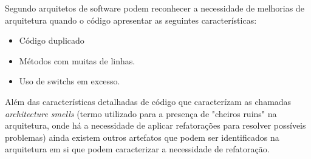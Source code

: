 Segundo \cite{babar2013agile} arquitetos de software podem reconhecer a necessidade de melhorias de arquitetura quando o código apresentar as seguintes características: 
    \begin{itemize}
        \item Código duplicado
        \item Métodos com muitas de linhas.
        \item Uso de switchs em excesso.
    \end{itemize}

Além das características detalhadas de código que caracterízam as chamadas \textit{architecture smells} (termo utilizado para a presença de "cheiros ruins" na arquitetura, onde há a necessidade de aplicar refatorações para resolver possíveis problemas) ainda existem outros artefatos que podem ser identificados na arquitetura em si que podem caracterizar a necessidade de refatoração.


